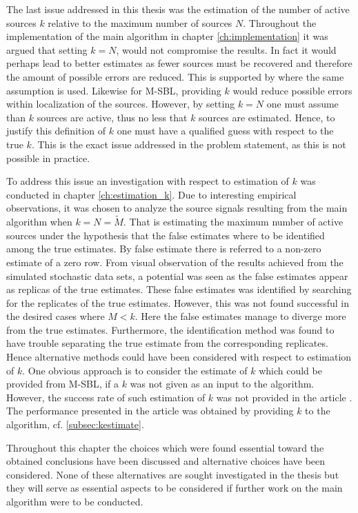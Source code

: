 The last issue addressed in this thesis was the estimation of the number of active sources $k$ relative to the maximum number of sources $N$. Throughout the implementation of the main algorithm in chapter \ref{ch:implementation} it was argued that setting $k = N$, would not compromise the results. 
In fact it would perhaps lead to better estimates as fewer sources must be recovered and therefore the amount of possible errors are reduced.
This is supported by \cite{Balkan2014} where the same assumption is used.
Likewise for M-SBL, providing $k$ would reduce possible errors within localization of the sources.
However, by setting $k = N$ one must assume than $k$ sources are active, thus no less that $k$ sources are estimated. 
Hence, to justify this definition of $k$ one must have a qualified guess with respect to the true $k$. 
This is the exact issue addressed in the problem statement, as this is not possible in practice.    

To address this issue an investigation with respect to estimation of $k$ was conducted in chapter \ref{ch:estimation_k}. 
Due to interesting empirical observations, it was chosen to analyze the source signals resulting from the main algorithm when $k = N = \widetilde{M}$. 
That is estimating the maximum number of active sources under the hypothesis that the false estimates where to be identified among the true estimates. By false estimate there is referred to a non-zero estimate of a zero row. 
From visual observation of the results achieved from the simulated stochastic data sets, a potential was seen as the false estimates appear as replicas of the true estimates. 
These false estimates was identified by searching for the replicates of the true estimates.
However, this was not found successful in the desired cases where $M < k$. 
Here the false estimates manage to diverge more from the true estimates. 
Furthermore, the identification method was found to have trouble separating the true estimate from the corresponding replicates.
Hence alternative methods could have been considered with respect to estimation of $k$. 
One obvious approach is to consider the estimate of $k$ which could be provided from M-SBL, if a $k$ was not given as an input to the algorithm. 
However, the success rate of such estimation of $k$ was not provided in the article \cite{Balkan2014}. The performance presented in the article was obtained by providing $k$ to the algorithm, cf. \ref{subsec:kestimate}.   

Throughout this chapter the choices which were found essential toward the obtained conclusions have been discussed and alternative choices have been considered. 
None of these alternatives are sought investigated in the thesis but they will serve as essential aspects to be considered if further work on the main algorithm were to be conducted. 